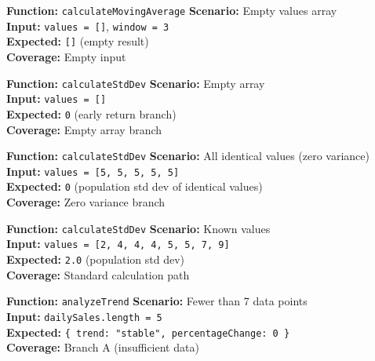 ﻿\documentclass[12pt,a4paper]{report}
\newcommand{\ptwo}{\textbf{\color{p2orange}P2}}
\newcommand{\pthree}{\textbf{\color{p3blue}P3}}
\begin{document}
\begin{tcolorbox}[testbox,title={FORE-003 \hfill \pthree}]
\textbf{Function:} \texttt{calculateMovingAverage} \quad \textbf{Scenario:} Empty values array \\
\textbf{Input:} \texttt{values = []}, \texttt{window = 3} \\
\textbf{Expected:} \texttt{[]} (empty result) \\
\textbf{Coverage:} Empty input
\end{tcolorbox}

\begin{tcolorbox}[testbox,title={FORE-004 \hfill \pthree}]
\textbf{Function:} \texttt{calculateStdDev} \quad \textbf{Scenario:} Empty array \\
\textbf{Input:} \texttt{values = []} \\
\textbf{Expected:} \texttt{0} (early return branch) \\
\textbf{Coverage:} Empty array branch
\end{tcolorbox}

\begin{tcolorbox}[testbox,title={FORE-005 \hfill \pthree}]
\textbf{Function:} \texttt{calculateStdDev} \quad \textbf{Scenario:} All identical values (zero variance) \\
\textbf{Input:} \texttt{values = [5, 5, 5, 5, 5]} \\
\textbf{Expected:} \texttt{0} (population std dev of identical values) \\
\textbf{Coverage:} Zero variance branch
\end{tcolorbox}

\begin{tcolorbox}[testbox,title={FORE-006 \hfill \pthree}]
\textbf{Function:} \texttt{calculateStdDev} \quad \textbf{Scenario:} Known values \\
\textbf{Input:} \texttt{values = [2, 4, 4, 4, 5, 5, 7, 9]} \\
\textbf{Expected:} \texttt{2.0} (population std dev) \\
\textbf{Coverage:} Standard calculation path
\end{tcolorbox}

\begin{tcolorbox}[testbox,title={FORE-007 \hfill \ptwo}]
\textbf{Function:} \texttt{analyzeTrend} \quad \textbf{Scenario:} Fewer than 7 data points \\
\textbf{Input:} \texttt{dailySales.length = 5} \\
\textbf{Expected:} \texttt{\{ trend: "stable", percentageChange: 0 \}} \\
\textbf{Coverage:} Branch A (insufficient data)
\end{tcolorbox}
\end{document}
